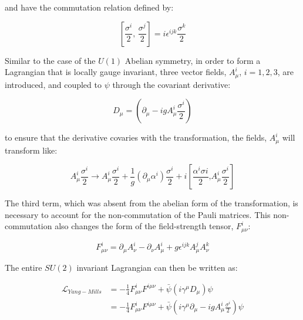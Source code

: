 \noindent and have the commutation relation defined by:

\begin{equation}\label{eq:pauli_matrices_commutator}
\left[\frac{\sigma^{i}}{2}\text{, }\frac{\sigma^{j}}{2}\right] =
i\epsilon^{ijk}\frac{\sigma^{k}}{2}
\end{equation}

\par Similar to the case of the $U(1)$ Abelian symmetry, in order to form
a Lagrangian that is locally gauge invariant, three vector fields,
$A_{\mu}^{i}$, $i=1,2,3$, are introduced, and coupled to $\psi$
through the covariant derivative:

\begin{equation}\label{eq:yang_mills_covariant_derivative}
D_{\mu} = (\partial_{\mu} - igA_{\mu}^{i}\frac{\sigma^{i}}{2})
\end{equation}

\noindent to ensure that the derivative covaries with the
transformation, the fields, $A_{\mu}^{i}$ will transform like:

\begin{equation}\label{eq:yang_mills_vector_field_transformation}
A_{\mu}^{i}\frac{\sigma^{i}}{2} \rightarrow
A_{\mu}^{i}\frac{\sigma^{i}}{2} +
\frac{1}{g}(\partial_{\mu}\alpha^{i})\frac{\sigma
^{i}}{2} +
i\left[\frac{\alpha^{i}\sigma{i}}{2}\text{,
}A_{\mu}^{i}\frac{\sigma^{i}}{2}\right]
\end{equation}

\noindent The third term, which was absent from the abelian form of
the transformation, is necessary to account for the non-commutation of
the Pauli matrices.  This non-commutation also changes the form of
the field-strength tensor, $F_{\mu\nu}^{i}$:

\begin{equation}\label{eq:yang_mills_field_strength_tensor}
F_{\mu\nu}^{i} = \partial_{\mu}A_{\nu}^{i} - \partial_{\nu}A_{\mu}^{i} + g\epsilon^{ijk}A_{\mu}^{j}A_{\nu}^{k}
\end{equation}

\noindent The entire $SU(2)$ invariant Lagrangian can then be written
as:

\begin{equation}\label{eq:yang_mills_invariant_lagrangian}
\begin{aligned}
\mathcal{L}_{Yang-Mills} & = -\frac{1}{4}F_{\mu\nu}^{i}F^{i\mu\nu} +
\bar{\psi}(i\gamma^{\mu}D_{\mu})\psi \\
 & = -\frac{1}{4}F_{\mu\nu}^{i}F^{i\mu\nu} +
\bar{\psi}(i\gamma^{\mu}\partial_{\mu} -
igA_{\mu}^{i}\frac{\sigma^{i}}{2})\psi
\end{aligned}
\end{equation}

